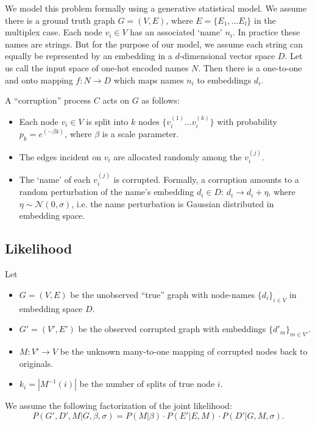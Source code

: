 \documentclass[12pt]{article}
\begin{document}
We model this problem formally using a generative statistical model. We assume there is a ground truth graph $G = (V, E)$, where $E = \{E_1, \ldots E_l\}$ in the multiplex case. Each node $v_i \in V$ has an associated `name' $n_i$. In practice these names are strings. But for the purpose of our model, we assume each string can equally be represented by an embedding in a $d$-dimensional vector space $D$. Let us call the input space of one-hot encoded names $N$. Then there is a one-to-one and onto mapping $f : N \rightarrow D$ which maps names $n_i$ to embeddings $d_i$.

A ``corruption'' process $C$ acts on $G$ as follows:

\begin{itemize}
\item Each node $v_i \in V$ is split into $k$ nodes $\{v_i^{(1)} \ldots v_i^{(k)}\}$ with probability $p_k = e^{(-\beta k)}$, where $\beta$ is a scale parameter.
\item The edges incident on $v_i$ are allocated randomly among the $v_i^{(j)}$.
\item The `name' of each $v_i^{(j)}$ is corrupted. Formally, a corruption amounts to a random perturbation of the name's embedding $d_i \in D$: $d_i \rightarrow d_i + \eta$, where $\eta \sim \mathcal{N}(0, \sigma)$, i.e. the name perturbation is Gaussian distributed in embedding space.
\end{itemize}

\subsection{Likelihood}
Let 
\begin{itemize}
\item $G = (V, E)$ be the unobserved ``true'' graph with node-names $\{d_i\}_{i \in V}$ in embedding space $D$.
\item $G' = (V', E')$ be the observed corrupted graph with embeddings $\{d'_m\}_{m \in V'}$.
\item $M: V' \to V$ be the unknown many-to-one mapping of corrupted nodes back to originals.
\item $k_i = |M^{-1}(i)|$ be the number of splits of true node $i$.
\end{itemize}

We assume the following factorization of the joint likelihood:
$$P(G', D', M | G, \beta, \sigma) = P(M | \beta) \cdot P(E' | E, M) \cdot P(D' | G, M, \sigma).$$
\end{document}
